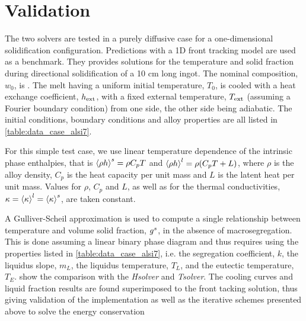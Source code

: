 \section{Validation}


The two solvers are tested in a purely diffusive case for a one-dimensional solidification configuration. 
Predictions with a 1D front tracking model \citep{gandin_constrained_2000} are used as a benchmark. They provides 
solutions for the temperature and solid fraction during directional solidification of a 10 cm long ingot. The nominal
composition, $w_0$, is . 
The melt having a uniform initial temperature, $T_0$, is cooled with a heat exchange coefficient, $h_{\text{ext}}$,
with a fixed external temperature, $T_{\text{ext}}$ (assuming a Fourier 
boundary condition) from one side, the other side being adiabatic. The initial conditions,
boundary conditions and alloy properties are all listed in \cref{table:data_case_alsi7}.

For this simple test case, 
we use linear temperature dependence of the intrinsic phase enthalpies, that is $\left \langle  \rho h  \right \rangle^s= \rho C_p T$ and $\left \langle  \rho h  \right \rangle^l= \rho (C_p T + L)$, 
where $\rho$ is the alloy density, $C_p$ is the heat capacity per unit mass and $L$ is the latent heat per unit mass. 
Values for $\rho$, $C_p$ and $L$, as well as for the thermal conductivities, $\kappa = \left \langle \kappa \right \rangle^l = \left \langle \kappa \right \rangle^s$, are taken constant. 

A Gulliver-Scheil approximation is used to compute a single relationship between temperature and volume solid fraction, ${g^s}$, in the 
absence of macrosegregation. This is done assuming a linear binary phase diagram and thus requires using the 
properties listed in \cref{table:data_case_alsi7}, i.e. the segregation coefficient, $k$, the liquidus slope, $m_L$, the 
liquidus temperature, $T_L$, and the eutectic temperature, $T_E$.  show the comparison with 
the \emph{Hsolver} and \emph{Tsolver}. The cooling curves and liquid fraction results are found superimposed to the front tacking solution, 
thus giving validation of the implementation as well as the iterative schemes presented above to solve the energy conservation 

